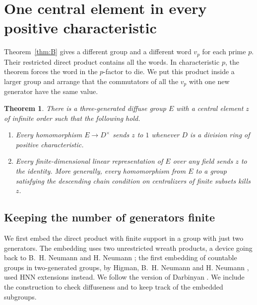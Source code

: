 \documentclass[11pt,a4paper]{article}
\newtheorem{maintheorem}{Theorem}
\numberwithin{equation}{section}
\begin{document}
\section{One central element in every positive characteristic}\label{sec:uniform}

Theorem~\ref{thm:B} gives a different group and a different word \(v_p\) for each prime \(p\). Their restricted direct product contains all the words. In characteristic \(p\), the theorem forces the word in the \(p\)-factor to die. We put this product inside a larger group and arrange that the commutators of all the \(v_p\) with one new generator have the same value.

\begin{maintheorem}\label{thm:D}
There is a three-generated diffuse group \(E\) with a central element \(z\) of infinite order such that the following hold.
\begin{enumerate}
\item Every homomorphism \(E\to D^\times\) sends \(z\) to \(1\) whenever \(D\) is a division ring of positive characteristic.
\item Every finite-dimensional linear representation of \(E\) over any field sends \(z\) to the identity. More generally, every homomorphism from \(E\) to a group satisfying the descending chain condition on centralizers of finite subsets kills \(z\).
\end{enumerate}
\end{maintheorem}

\subsection{Keeping the number of generators finite}

We first embed the direct product with finite support in a group with just two generators. The embedding uses two unrestricted wreath products, a device going back to B.~H. Neumann and H. Neumann \cite{NN}; the first embedding of countable groups in two-generated groups, by Higman, B.~H. Neumann and H. Neumann \cite{HNN}, used HNN extensions instead. We follow the version of Darbinyan \cite[Section~3]{Darbinyan}. We include the construction to check diffuseness and to keep track of the embedded subgroups.
\end{document}
